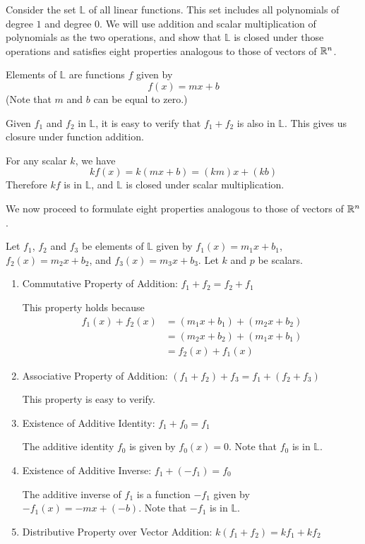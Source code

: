 \documentclass{ximera}
\begin{document}
\begin{example}\label{ex:linfunctionsvectspace} Consider the set $\mathbb{L}$ of all linear functions.  This set includes all polynomials of degree $1$ and degree $0$.  We will use addition and scalar multiplication of polynomials as the two operations, and show that $\mathbb{L}$ is closed under those operations and satisfies eight properties analogous to those of vectors of $\mathbb{R}^n$.
\begin{explanation}
Elements of $\mathbb{L}$ are functions $f$ given by
$$f(x)=mx+b$$
(Note that $m$ and $b$ can be equal to zero.)

Given $f_1$ and $f_2$ in $\mathbb{L}$, it is easy to verify that $f_1+f_2$ is also in $\mathbb{L}$.  This gives us closure under function addition.

For any scalar $k$, we have
$$kf(x)=k(mx+b)=(km)x+(kb)$$
Therefore $kf$ is in $\mathbb{L}$, and $\mathbb{L}$ is closed under scalar multiplication.

We now proceed to formulate eight properties analogous to those of vectors of $\mathbb{R}^n$.

Let $f_1$, $f_2$ and $f_3$ be elements of $\mathbb{L}$ given by $f_1(x)=m_1 x + b_1$, $f_2(x)=m_2 x + b_2$, and $f_3(x)=m_3 x + b_3$. Let $k$ and $p$ be scalars.  
  \begin{enumerate}
  \item 
  Commutative Property of Addition:  
  \quad $f_1+f_2=f_2+f_1$
  
  This property holds because
  \begin{align*}f_1(x) + f_2(x) &= (m_1 x + b_1) + (m_2 x + b_2)\\ &= (m_2 x + b_2) + (m_1 x + b_1)\\ &= f_2(x) + f_1(x)
  \end{align*}
  \item 
  Associative Property of Addition:\quad
  $(f_1 + f_2) + f_3 = f_1 + (f_2 + f_3)$
  
  This property is easy to verify.
  \item 
  Existence of Additive Identity:\quad  
  $f_1 + f_0 = f_1$
  
  The additive identity $f_0$ is given by $f_0(x)=0$.  Note that $f_0$ is in $\mathbb{L}$.
  \item 
  Existence of Additive Inverse: \quad 
    $f_1 + (-f_1) = f_0$ 
    
The additive inverse of $f_1$ is a function $-f_1$ given by $-f_1(x)=-mx+(-b)$.    Note that $-f_1$ is in $\mathbb{L}$.
  \item
  Distributive Property over Vector Addition:\quad 
  $k(f_1+f_2)=kf_1+kf_2$
  

\end{enumerate}
\end{explanation}
\end{example}
\end{document}
